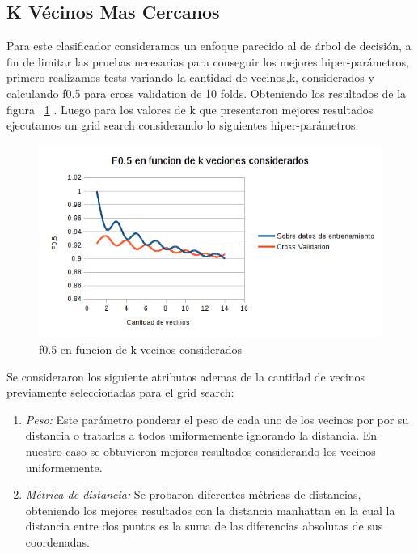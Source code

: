 \begin{enumerate}


\subsection{K Vécinos Mas Cercanos}

Para este clasificador consideramos un enfoque parecido al de árbol de decisión, a fin de limitar las pruebas necesarias para conseguir los mejores hiper-parámetros, primero realizamos tests variando la cantidad de vecinos,k, considerados y calculando f0.5 para cross validation de 10 folds. Obteniendo los resultados de la figura ~\ref{fig:knn_f05_en_funcion_vecinos} .
Luego para los valores de k que presentaron mejores resultados ejecutamos un grid search considerando lo siguientes hiper-parámetros. 
\begin{figure}[H]
    \centering
        \includegraphics[width=\textwidth]{plots/knn_f05_en_funcion_vecinos.png}
        \caption{f0.5 en funcíon de k vecinos considerados}
        \label{fig:knn_f05_en_funcion_vecinos}
\end{figure}
    Se consideraron los siguiente atributos ademas de la cantidad de vecinos previamente seleccionadas para el grid search:
 \begin{enumerate}
\item \textit{Peso:} Este parámetro ponderar el peso de cada uno de los vecinos por por su distancia o tratarlos a todos uniformemente ignorando la distancia. En nuestro caso se obtuvieron mejores resultados considerando los vecinos uniformemente.  
\item \textit{Métrica de distancia:} Se probaron diferentes métricas de distancias, obteniendo los mejores resultados con la distancia manhattan en la cual la distancia entre dos puntos es la suma de las diferencias absolutas de sus coordenadas.
\end{enumerate}


\end{enumerate}
